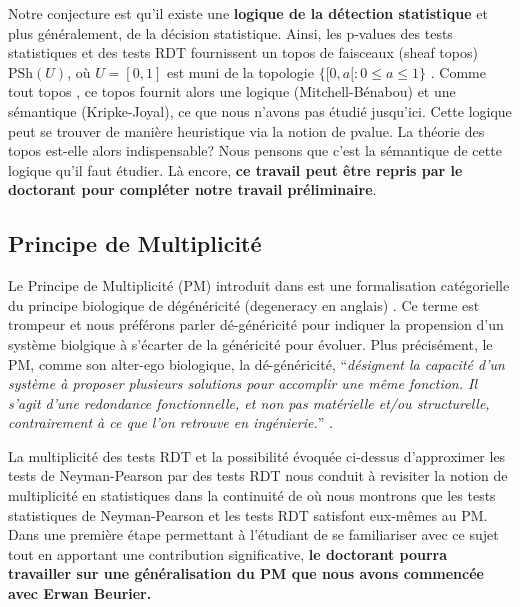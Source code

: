 \documentclass[a4paper, 10pt]{article}
\begin{document}
Notre conjecture est qu'il existe une \textbf{logique de la détection statistique} et plus généralement, de la décision statistique. Ainsi, les p-values des tests statistiques et des tests RDT fournissent un topos de faisceaux (sheaf topos) $\text{PSh}(U)$, où $U = [0,1]$ est muni de la topologie $ \{ [0,a[: 0 \leqslant a \leqslant 1 \}$ \cite{beurier:hal-02190029}. Comme tout topos \cite{McLarty1992, MacLane1994}, ce topos fournit alors une logique (Mitchell-Bénabou) et une sémantique (Kripke-Joyal), ce que nous n'avons pas étudié jusqu'ici. Cette logique peut se trouver de manière heuristique via la notion de pvalue. La théorie des topos est-elle alors indispensable? Nous pensons que c'est la sémantique de cette logique qu'il faut étudier. Là encore,\textbf{ ce travail peut être repris par le doctorant pour compléter notre travail préliminaire}.

\subsection{Principe de Multiplicité}

Le Principe de Multiplicité (PM) introduit dans \cite{EhresmannVanbremeersch2007} est une formalisation catégorielle du principe biologique de dégénéricité (degeneracy en anglais) \cite{Edelman2001}. Ce terme est trompeur et nous préférons parler dé-généricité pour indiquer la propension d'un système biolgique à s'écarter de la généricité pour évoluer. Plus précisément, le PM, comme son alter-ego biologique, la dé-généricité, ``{\em désignent la capacité d’un système à proposer plusieurs solutions pour accomplir une même fonction. Il s’agit d’une redondance fonctionnelle, et non pas matérielle et/ou structurelle, contrairement à ce que l’on retrouve en ingénierie.}'' \cite{beurier2020}. 

La multiplicité des tests RDT et la possibilité évoquée ci-dessus d'approximer les tests de Neyman-Pearson par des tests RDT nous conduit à revisiter la notion de multiplicité en statistiques dans la continuité de \cite{interfacingPastor2019} où nous montrons que les tests statistiques de Neyman-Pearson et les tests RDT satisfont eux-mêmes au PM. %
Dans une première étape permettant à l'étudiant de se familiariser avec ce sujet tout en apportant une contribution significative, \textbf{le doctorant pourra travailler sur une généralisation du PM que nous avons commencée avec Erwan Beurier.}



\end{document}
